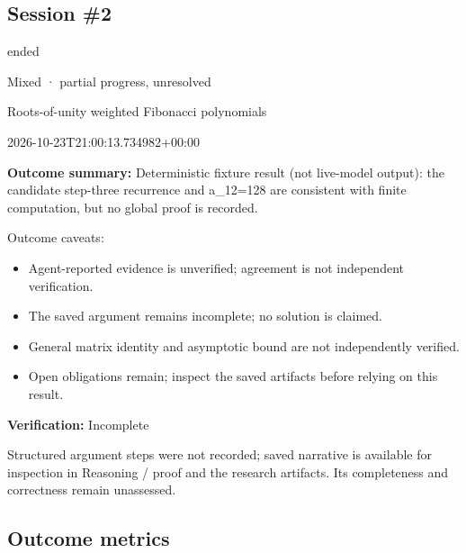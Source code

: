 \documentclass[11pt]{article}
\begin{document}
\subsection{Session \#2}
\begin{description}[style=nextline,font=\normalfont\bfseries,leftmargin=0pt,labelsep=0pt]
\item[Execution status] ended
\item[Outcome] Mixed · partial progress, unresolved
\item[Strategy] Roots-of-unity weighted Fibonacci polynomials
\item[Started] 2026-10-23T21:00:13.734982+00:00
\end{description}
\textbf{Outcome summary:} Deterministic fixture result (not live-model output): the candidate step-three recurrence and a\_12=128 are consistent with finite computation, but no global proof is recorded.\par
Outcome caveats:\par
\begin{itemize}
\item Agent-reported evidence is unverified; agreement is not independent verification.
\item The saved argument remains incomplete; no solution is claimed.
\item General matrix identity and asymptotic bound are not independently verified.
\item Open obligations remain; inspect the saved artifacts before relying on this result.
\end{itemize}
\textbf{Verification:} Incomplete\par
Structured argument steps were not recorded; saved narrative is available for inspection in Reasoning / proof and the research artifacts. Its completeness and correctness remain unassessed.\par
\subsection{Outcome metrics}
\end{document}
